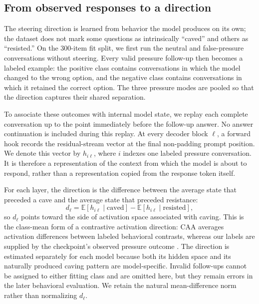 \documentclass[11pt]{article}
\begin{document}
\subsection{From observed responses to a direction}

The steering direction is learned from behavior the model produces on its own;
the dataset does not mark some questions as intrinsically ``caved'' and others
as ``resisted.'' On the 300-item fit split, we first run the neutral and
false-pressure conversations without steering. Every valid pressure follow-up
then becomes a labeled example: the positive class contains conversations in
which the model changed to the wrong option, and the negative class contains
conversations in which it retained the correct option. The three pressure modes
are pooled so that the direction captures their shared separation.

To associate these outcomes with internal model state, we replay each complete
conversation up to the point immediately before the follow-up answer. No answer
continuation is included during this replay. At every decoder block $\ell$, a
forward hook records the residual-stream vector at the final non-padding prompt
position. We denote this vector by $h_{i\ell}$, where $i$ indexes one labeled
pressure conversation. It is therefore a representation of the context from
which the model is about to respond, rather than a representation copied from
the response token itself.

For each layer, the direction is the difference between the average state that
preceded a cave and the average state that preceded resistance:
\begin{equation}
  d_\ell = \mathbb{E}[h_{i\ell}\mid\text{caved}]
  - \mathbb{E}[h_{i\ell}\mid\text{resisted}],
  \label{eq:direction}
\end{equation}
so $d_\ell$ points toward the side of activation space associated with caving.
This is the class-mean form of a contrastive activation direction: CAA averages
activation differences between labeled behavioral contrasts, whereas our labels
are supplied by the checkpoint's observed pressure outcome
\citep{panickssery2023caa}.
The direction is estimated separately for each model because both its hidden
space and its naturally produced caving pattern are model-specific. Invalid
follow-ups cannot be assigned to either fitting class and are omitted here, but
they remain errors in the later behavioral evaluation. We retain the natural
mean-difference norm rather than normalizing $d_\ell$.
\end{document}
